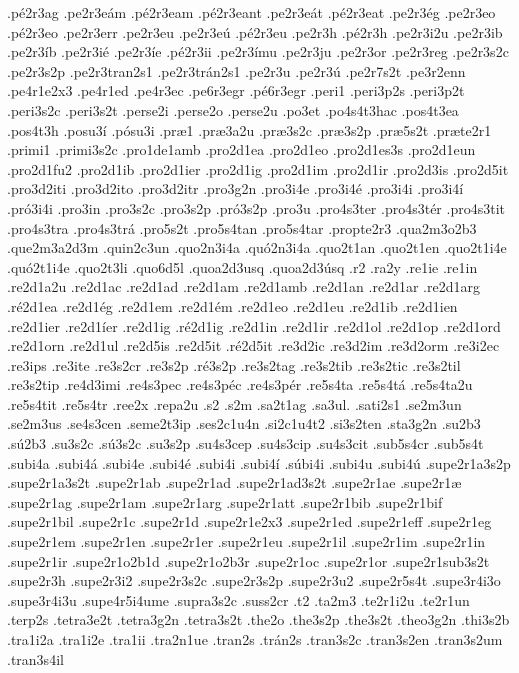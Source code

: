 {.pé2r3ag
.pe2r3eám
.pé2r3eam
.pé2r3eant
.pe2r3eát
.pé2r3eat
.pe2r3ég
.pe2r3eo
.pé2r3eo
.pe2r3err
.pe2r3eu
.pe2r3eú
.pé2r3eu
.pe2r3h
.pé2r3h
.pe2r3i2u
.pe2r3ib
.pe2r3íb
.pe2r3ié
.pe2r3íe
.pé2r3ii
.pe2r3ímu
.pe2r3ju
.pe2r3or
.pe2r3reg
.pe2r3s2c
.pe2r3s2p
.pe2r3tran2s1
.pe2r3trán2s1
.pe2r3u
.pe2r3ú
.pe2r7s2t
.pe3r2enn
.pe4r1e2x3
.pe4r1ed
.pe4r3ec
.pe6r3egr
.pé6r3egr
.peri1
.peri3p2s
.peri3p2t
.peri3s2c
.peri3s2t
.perse2i
.perse2o
.perse2u
.po3et
.po4s4t3hac
.pos4t3ea
.pos4t3h
.posu3í
.pósu3i
.præ1
.præ3a2u
.præ3s2c
.præ3s2p
.præ5s2t
.præte2r1
.primi1
.primi3s2c
.pro1de1amb
.pro2d1ea
.pro2d1eo
.pro2d1es3s
.pro2d1eun
.pro2d1fu2
.pro2d1ib
.pro2d1ier
.pro2d1ig
.pro2d1im
.pro2d1ir
.pro2d3is
.pro2d5it
.pro3d2iti
.pro3d2ito
.pro3d2itr
.pro3g2n
.pro3i4e
.pro3i4é
.pro3i4i
.pro3i4í
.pró3i4i
.pro3in
.pro3s2c
.pro3s2p
.pró3s2p
.pro3u
.pro4s3ter
.pro4s3tér
.pro4s3tit
.pro4s3tra
.pro4s3trá
.pro5s2t
.pro5s4tan
.pro5s4tar
.propte2r3
.qua2m3o2b3
.que2m3a2d3m
.quin2c3un
.quo2n3i4a
.quó2n3i4a
.quo2t1an
.quo2t1en
.quo2t1i4e
.quó2t1i4e
.quo2t3li
.quo6d5l
.quoa2d3usq
.quoa2d3úsq
.r2
.ra2y
.re1ie
.re1in
.re2d1a2u
.re2d1ac
.re2d1ad
.re2d1am
.re2d1amb
.re2d1an
.re2d1ar
.re2d1arg
.ré2d1ea
.re2d1ég
.re2d1em
.re2d1ém
.re2d1eo
.re2d1eu
.re2d1ib
.re2d1ien
.re2d1ier
.re2d1íer
.re2d1ig
.ré2d1ig
.re2d1in
.re2d1ir
.re2d1ol
.re2d1op
.re2d1ord
.re2d1orn
.re2d1ul
.re2d5is
.re2d5it
.ré2d5it
.re3d2ic
.re3d2im
.re3d2orm
.re3i2ec
.re3ips
.re3ite
.re3s2cr
.re3s2p
.ré3s2p
.re3s2tag
.re3s2tib
.re3s2tic
.re3s2til
.re3s2tip
.re4d3imi
.re4s3pec
.re4s3péc
.re4s3pér
.re5s4ta
.re5s4tá
.re5s4ta2u
.re5s4tit
.re5s4tr
.ree2x
.repa2u
.s2
.s2m
.sa2t1ag
.sa3ul.
.sati2s1
.se2m3un
.se2m3us
.se4s3cen
.seme2t3ip
.ses2c1u4n
.si2c1u4t2
.si3s2ten
.sta3g2n
.su2b3
.sú2b3
.su3s2c
.sú3s2c
.su3s2p
.su4s3cep
.su4s3cip
.su4s3cit
.sub5s4cr
.sub5s4t
.subi4a
.subi4á
.subi4e
.subi4é
.subi4i
.subi4í
.súbi4i
.subi4u
.subi4ú
.supe2r1a3s2p
.supe2r1a3s2t
.supe2r1ab
.supe2r1ad
.supe2r1ad3s2t
.supe2r1ae
.supe2r1æ
.supe2r1ag
.supe2r1am
.supe2r1arg
.supe2r1att
.supe2r1bib
.supe2r1bif
.supe2r1bil
.supe2r1c
.supe2r1d
.supe2r1e2x3
.supe2r1ed
.supe2r1eff
.supe2r1eg
.supe2r1em
.supe2r1en
.supe2r1er
.supe2r1eu
.supe2r1il
.supe2r1im
.supe2r1in
.supe2r1ir
.supe2r1o2b1d
.supe2r1o2b3r
.supe2r1oc
.supe2r1or
.supe2r1sub3s2t
.supe2r3h
.supe2r3i2
.supe2r3s2c
.supe2r3s2p
.supe2r3u2
.supe2r5s4t
.supe3r4i3o
.supe3r4i3u
.supe4r5i4ume
.supra3s2c
.suss2cr
.t2
.ta2m3
.te2r1i2u
.te2r1un
.terp2s
.tetra3e2t
.tetra3g2n
.tetra3s2t
.the2o
.the3s2p
.the3s2t
.theo3g2n
.thi3s2b
.tra1i2a
.tra1i2e
.tra1ii
.tra2n1ue
.tran2s
.trán2s
.tran3s2c
.tran3s2en
.tran3s2um
.tran3s4il
}
